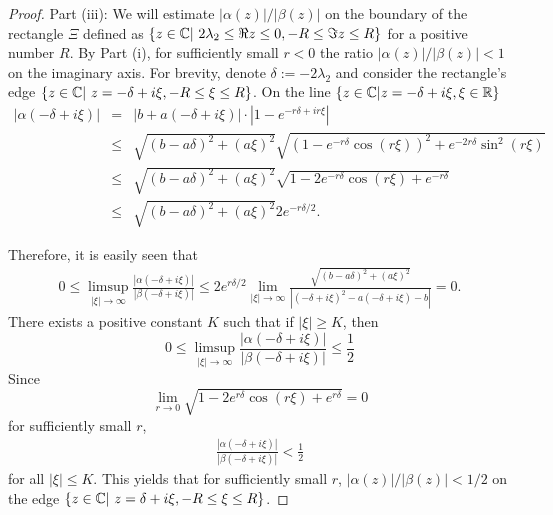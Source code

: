 \documentclass[12pt,letterpaper]{amsart}
\theoremstyle{definition}
\theoremstyle{remark}
\numberwithin{equation}{section}
\begin{document}
\begin{proof}
\bigskip
Part (iii): We will estimate $|\alpha (z)|/|\beta(z)|$ on the boundary of the rectangle $\Xi$ defined as $\{ z\in \mathbb C | \ 2\lambda_2 \le \Re z\le 0, -R \le \Im z \le R\}$ for a positive number $R$. By Part (i), for sufficiently small $r<0$ the ratio $|\alpha (z)|/|\beta (z)| <1$ on the imaginary axis. For brevity, denote $\delta :=-2\lambda_2$ and consider the rectangle's edge $\{ z\in \mathbb C | \ z=-\delta +i\xi , -R \le \xi \le R\}$. On the line
$\{ z\in \mathbb C | z=-\delta +i\xi , \xi \in \mathbb R\}$
\begin{eqnarray}
|\alpha (-\delta+i\xi ) | &=& |b+a(-\delta+i\xi)|\cdot |1-e^{-r\delta+ir\xi}| \nonumber \\
&\le& \sqrt{(b-a\delta)^2+(a\xi)^2}  \sqrt { (1-e^{-r\delta}\cos (r\xi ))^2+e^{-2r\delta}\sin^2(r\xi )  } \nonumber \\
&\le&  
  \sqrt{(b-a\delta)^2+(a\xi)^2}  \sqrt{1-2e^{-r\delta}\cos(r\xi )+e^{-r\delta}} \nonumber \\
  &\le &  \sqrt{(b-a\delta)^2+(a\xi)^2} 2e^{-r\delta/2}.  \label {hc2}
\end{eqnarray}

Therefore, it is easily seen that
\begin{align*}
0\le \limsup_{|\xi|\to \infty} \frac{|\alpha (-\delta +i\xi )|}{|\beta (-\delta +i\xi )|} \le 2e^{r\delta/2} \lim_{|\xi| \to\infty}   
 \frac{ \sqrt{(b-a\delta)^2+(a\xi)^2} }{|(-\delta +i\xi)^2-a(-\delta+i\xi)-b|} =0.
\end{align*}
There exists a positive constant $K$ such that if $|\xi| \ge K$, then
$$
0\le \limsup_{|\xi|\to \infty} \frac{|\alpha (-\delta +i\xi )|}{|\beta (-\delta +i\xi )|} \le  \frac{1}{2}
$$
Since
$$
\lim_{r\to 0}  \sqrt{1-2e^{r\delta}\cos(r\xi )+e^{r\delta}} =0
$$
for sufficiently small  $r$, 
\begin{align}
\frac{|\alpha (-\delta+i\xi )|}{|\beta (-\delta +i\xi )|} <\frac{1}{2}
\end{align}
for all $|\xi| \le K$. This yields that for sufficiently small $r$, $|\alpha (z)|/|\beta (z)|<1/2$ on the edge 
$\{ z\in \mathbb C | \ z=\delta +i\xi , -R \le \xi \le R\}$. 


\end{proof}
\end{document}
